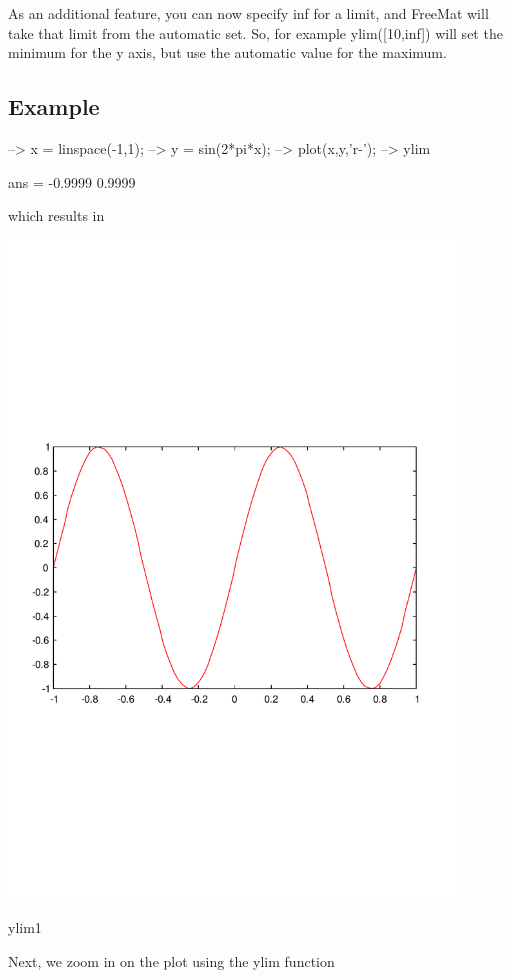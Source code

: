 As an additional feature, you can now specify {\ttfamily inf} for a limit, and Free\-Mat will take that limit from the automatic set. So, for example {\ttfamily ylim(\mbox{[}10,inf\mbox{]})} will set the minimum for the y axis, but use the automatic value for the maximum. \hypertarget{variables_struct_Example}{}\subsection{Example}\label{variables_struct_Example}

\begin{DoxyVerbInclude}
--> x = linspace(-1,1);
--> y = sin(2*pi*x);
--> plot(x,y,'r-');
--> ylim  %

ans = 
   -0.9999    0.9999 
\end{DoxyVerbInclude}


which results in  
\begin{DoxyImage}
\includegraphics[width=12cm]{ylim1}
\caption{ylim1}
\end{DoxyImage}
 Next, we zoom in on the plot using the {\ttfamily ylim} function


